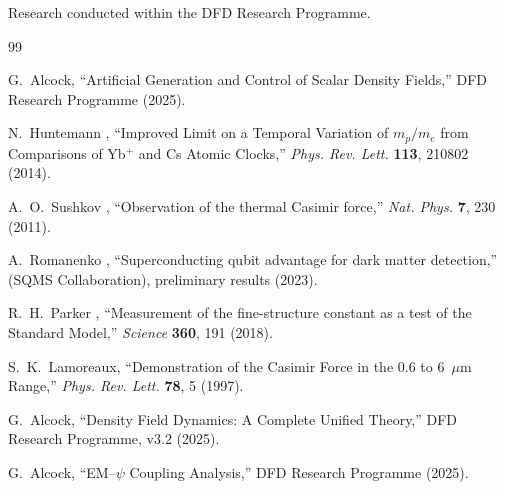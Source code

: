 \documentclass[aps,prd,twocolumn,superscriptaddress,nofootinbib]{revtex4-2}
\begin{document}
\begin{acknowledgments}
Research conducted within the DFD Research Programme.
\end{acknowledgments}

\begin{thebibliography}{99}

G.~Alcock, ``Artificial Generation and Control of Scalar
Density Fields,'' DFD Research Programme (2025).

N.~Huntemann \etal, ``Improved Limit on a Temporal Variation
of $m_p/m_e$ from Comparisons of Yb$^+$ and Cs Atomic
Clocks,'' \textit{Phys. Rev. Lett.} \textbf{113}, 210802 (2014).

A.~O.~Sushkov \etal, ``Observation of the thermal Casimir
force,'' \textit{Nat. Phys.} \textbf{7}, 230 (2011).

A.~Romanenko \etal, ``Superconducting qubit advantage for
dark matter detection,'' (SQMS Collaboration), preliminary
results (2023).

R.~H.~Parker \etal, ``Measurement of the fine-structure
constant as a test of the Standard Model,''
\textit{Science} \textbf{360}, 191 (2018).

S.~K.~Lamoreaux, ``Demonstration of the Casimir Force in the
0.6 to 6~$\mu$m Range,'' \textit{Phys. Rev. Lett.}
\textbf{78}, 5 (1997).

G.~Alcock, ``Density Field Dynamics: A Complete Unified Theory,''
DFD Research Programme, v3.2 (2025).

G.~Alcock, ``EM--$\psi$ Coupling Analysis,''
DFD Research Programme (2025).

\end{thebibliography}
\end{document}
